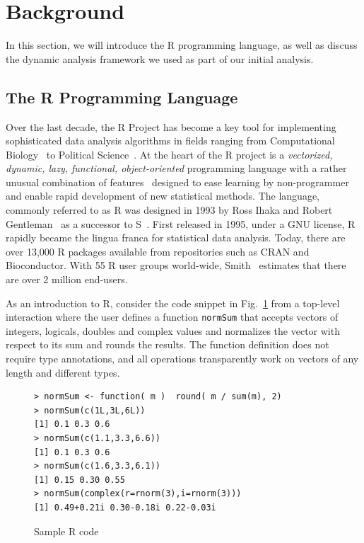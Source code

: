 \documentclass[acmsmall,review,anonymous]{acmart}\settopmatter{printfolios=true,printccs=false,printacmref=false}
\newcommand{\code}[1]{{\lstinline[style=Rin]!#1!}\xspace}
\begin{document}
%
%
%
\section{Background}

In this section, we will introduce the R programming language, as well as discuss the dynamic analysis framework we used as part of our initial analysis.

%
%
%
%
\subsection{The R Programming Language}
\label{sec:R}

Over the last decade, the R Project has become a key tool for implementing
sophisticated data analysis algorithms in fields ranging from Computational
Biology~\cite{R05} to Political Science~\cite{R:Keele:2008}. At the heart of
the R project is a \emph{vectorized, dynamic, lazy, functional,
  object-oriented} programming language with a rather unusual combination of
features~\cite{ecoop12} designed to ease learning by non-programmer and
enable rapid development of new statistical methods.  The language, commonly
referred to as R was designed in 1993 by Ross Ihaka and Robert
Gentleman~\cite{R96} as a successor to S~\cite{S88}.  First released in
1995, under a GNU license, R rapidly became the lingua franca for
statistical data analysis. Today, there are over 13,000 R packages available
from repositories such as CRAN and Bioconductor.  With 55 R user groups
world-wide, Smith~\cite{eco11} estimates that there are over 2 million
end-users.

As an introduction to R, consider the code snippet in Fig.~\ref{sample} from
a top-level interaction where the user defines a function \code{normSum}
that accepts vectors of integers, logicals, doubles and complex values and
normalizes the vector with respect to its sum and rounds the results. The
function definition does not require type annotations, and all operations
transparently work on vectors of any length and different types.

\begin{figure}[!hb]{\small
\begin{lstlisting}
> normSum <- function( m )  round( m / sum(m), 2)
> normSum(c(1L,3L,6L))
[1] 0.1 0.3 0.6
> normSum(c(1.1,3.3,6.6))
[1] 0.1 0.3 0.6
> normSum(c(1.6,3.3,6.1))
[1] 0.15 0.30 0.55
> normSum(complex(r=rnorm(3),i=rnorm(3)))
[1] 0.49+0.21i 0.30-0.18i 0.22-0.03i
\end{lstlisting}}
\caption{Sample R code}\label{sample}
\end{figure}
\end{document}
